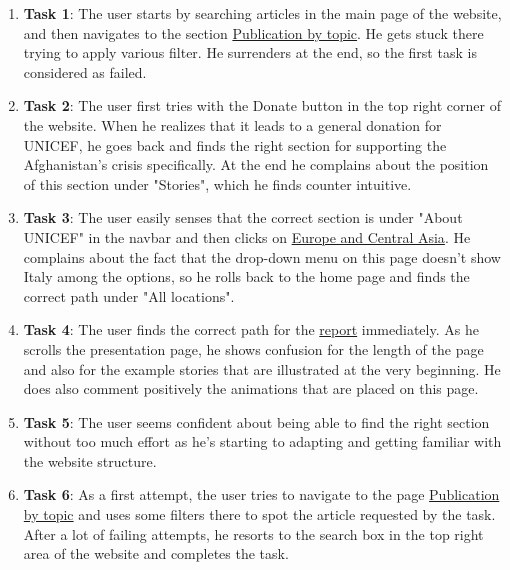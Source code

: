 \begin{enumerate}
	\item \textbf{Task 1}: The user starts by searching articles in the main page of the website, and then navigates to the section \href{https://www.unicef.org/reports}{Publication by topic}. He gets stuck there trying to apply various filter. He surrenders at the end, so the first task is considered as failed.
	\item \textbf{Task 2}: The user first tries with the Donate button in the top right corner of the website. When he realizes that it leads to a general donation for UNICEF, he goes back and finds the right section for supporting the Afghanistan's crisis specifically. At the end he complains about the position of this section under "Stories", which he finds counter intuitive.
	\item \textbf{Task 3}: The user easily senses that the correct section is under "About UNICEF" in the navbar and then clicks on \href{https://www.unicef.org/where-we-work#europe-and-central-asia}{Europe and Central Asia}. He complains about the fact that the drop-down menu on this page doesn't show Italy among the options, so he rolls back to the home page and finds the correct path under "All locations".
	\item \textbf{Task 4}: The user finds the correct path for the \href{https://www.unicef.org/reports/state-of-worlds-children}{report} immediately. As he scrolls the presentation page, he shows confusion for the length of the page and also for the example stories that are illustrated at the very beginning. He does also comment positively the animations that are placed on this page. 
	\item \textbf{Task 5}: The user seems confident about being able to find the right section without too much effort as he's starting to adapting and getting familiar with the website structure. 
	\item \textbf{Task 6}: As a first attempt, the user tries to navigate to the page \href{https://www.unicef.org/reports}{Publication by topic} and uses some filters there to spot the article requested by the task. After a lot of failing attempts, he resorts to the search box in the top right area of the website and completes the task.
	
\end{enumerate}





\vspace{1cm}

